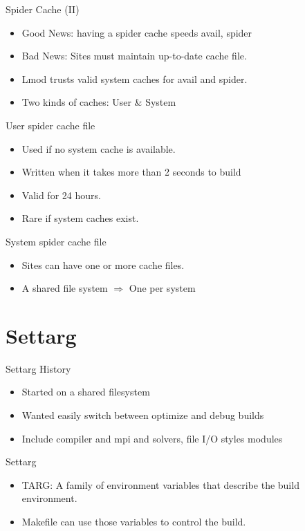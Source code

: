 \documentclass{beamer}
\begin{document}
\begin{frame}{Spider Cache (II)}
  \begin{itemize}
     \item Good News: having a spider cache speeds avail, spider
     \item Bad News: Sites must maintain up-to-date cache file.
     \item Lmod trusts valid system caches for avail and spider.
     \item Two kinds of caches: User & System 
  \end{itemize}
\end{frame}

\begin{frame}{User spider cache file}
  \begin{itemize}
     \item Used if no system cache is available.
     \item Written when it takes more than 2 seconds to build
     \item Valid for 24 hours.
     \item Rare if system caches exist.
  \end{itemize}
\end{frame}

\begin{frame}{System spider cache file}
  \begin{itemize}
     \item Sites can have one or more cache files.
     \item A shared file system $\Rightarrow$ One
       per system
  \end{itemize}
\end{frame}

\section{Settarg}

\begin{frame}{Settarg History}
  \begin{itemize}
     \item Started on a shared filesystem
     \item Wanted easily switch between optimize and debug
       builds
     \item Include compiler and mpi and solvers, file I/O styles modules
  \end{itemize}
\end{frame}

\begin{frame}{Settarg}
  \begin{itemize}
     \item TARG: A family of environment variables that describe the
       build environment.
     \item Makefile can use those variables to control the build.
  \end{itemize}
\end{frame}
\end{document}
